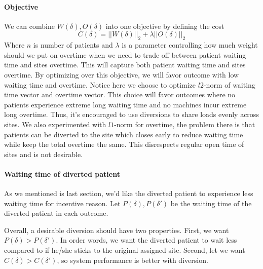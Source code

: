 \paragraph{Objective} We can combine $W(\delta), O(\delta)$ into one objective by defining the cost
\[  C(\delta) = ||W(\delta)||_2 + \lambda ||O(\delta)||_2 \]
Where $n$ is number of patients and $\lambda$ is a parameter controlling
how much weight should we put on overtime when we need to trade off
between patient waiting time and sites overtime.
This will capture both patient waiting time and sites overtime.
By optimizing over this objective, we will favor outcome with low waiting time and overtime.
Notice here we choose to optimize $l2$-norm of waiting time vector
and overtime vector. This choice will favor
outcomes where no patients experience extreme long waiting time
and no machines incur extreme long overtime. Thus, it's encouraged
to use diversions to share loads evenly across sites.
We also experimented with $l1$-norm for overtime, the problem there
is that patients can be diverted to the site which closes early
to reduce waiting time while keep the total overtime the same.
This disrespects regular open time of sites and is not desirable.

\paragraph{Waiting time of diverted patient} As we mentioned is last section, we'd like the diverted patient to experience less waiting time for incentive reason. Let $P(\delta), P(\delta')$ be the waiting time of the diverted patient in each outcome.

Overall, a desirable diversion should have two properties. First, we want $P(\delta) > P(\delta')$.
In order words, we want the diverted patient to wait less compared to if he/she sticks to the original
assigned site. Second, let we want $C(\delta) > C(\delta')$, so system performance is better with diversion.
